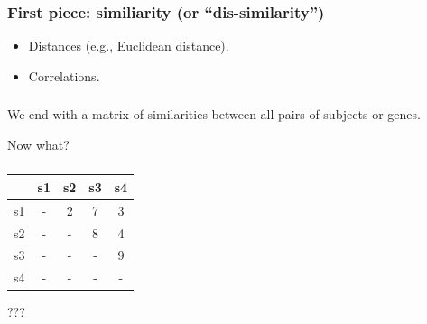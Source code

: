 \begin{frame}
\frametitle{First piece: similiarity (or ``dis-similarity'')}
\begin{itemize}
\item Distances (e.g., Euclidean distance).
\item Correlations.
\end{itemize}
\end{frame}


\begin{frame}
  \textblockcolour{}
\end{frame}



\begin{frame}
\frametitle{}

We end with a matrix of similarities between all pairs of subjects or genes.

\vspace*{14pt}
Now what?



\end{frame}



\begin{frame}
\frametitle{}

\begin{center}
\begin{tabular}{c||c|c|c|c|}
   &   s1   &   s2   &    s3   &   s4 \\
\hline
\hline
s1 &   -    &   2    &     7   &    3 \\
\hline
s2 &   -    &   -    &     8   &    4 \\
\hline
s3 &   -    &   -    &     -   &    9 \\
\hline
s4 &   -    &   -    &     -   &    - \\
\hline
\end{tabular} 

\end{center}
\vspace*{12pt}

\centerline{???}


\end{frame}






